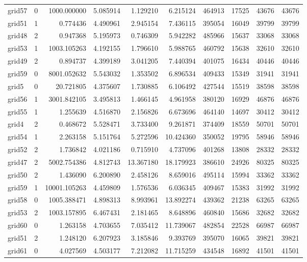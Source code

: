 \begin{longtable}{|l|r|r|r|r|r|r|r|r|r|}
grid57 & 0 & 1000.000000 & 5.085914 & 1.129210 & 6.215124 & 464913 & 17525 & 43676 & 43676 \\
grid51 & 1 & 0.774436 & 4.490961 & 2.945154 & 7.436115 & 395054 & 16049 & 39799 & 39799 \\
grid48 & 2 & 0.947368 & 5.195973 & 0.746309 & 5.942282 & 485966 & 15637 & 33068 & 33068 \\
grid53 & 1 & 1003.105263 & 4.192155 & 1.796610 & 5.988765 & 460792 & 15638 & 32610 & 32610 \\
grid49 & 2 & 0.894737 & 4.399189 & 3.041205 & 7.440394 & 401075 & 16434 & 40446 & 40446 \\
grid59 & 0 & 8001.052632 & 5.543032 & 1.353502 & 6.896534 & 409433 & 15349 & 31941 & 31941 \\
grid5 & 0 & 20.721805 & 4.375607 & 1.730885 & 6.106492 & 427544 & 15519 & 38598 & 38598 \\
grid56 & 1 & 3001.842105 & 3.495813 & 1.466145 & 4.961958 & 380120 & 16929 & 46876 & 46876 \\
grid55 & 1 & 1.255639 & 4.516870 & 2.156826 & 6.673696 & 464140 & 14697 & 30412 & 30412 \\
grid4 & 2 & 0.468672 & 5.528471 & 3.733400 & 9.261871 & 374409 & 18559 & 50701 & 50701 \\
grid54 & 1 & 2.263158 & 5.151764 & 5.272596 & 10.424360 & 350052 & 19795 & 58946 & 58946 \\
grid52 & 2 & 1.736842 & 4.021186 & 0.715910 & 4.737096 & 401268 & 13808 & 28332 & 28332 \\
grid47 & 2 & 5002.754386 & 4.812743 & 13.367180 & 18.179923 & 386610 & 24926 & 80325 & 80325 \\
grid50 & 2 & 1.436090 & 6.200890 & 2.458126 & 8.659016 & 495114 & 15994 & 33362 & 33362 \\
grid59 & 1 & 10001.105263 & 4.459809 & 1.576536 & 6.036345 & 409467 & 15383 & 31992 & 31992 \\
grid58 & 0 & 1005.388471 & 4.898313 & 8.993961 & 13.892274 & 439362 & 21238 & 63265 & 63265 \\
grid53 & 2 & 1003.157895 & 6.467431 & 2.181465 & 8.648896 & 460840 & 15686 & 32682 & 32682 \\
grid60 & 0 & 1.263158 & 4.703655 & 7.035412 & 11.739067 & 482854 & 22528 & 66987 & 66987 \\
grid51 & 2 & 1.248120 & 6.207923 & 3.185846 & 9.393769 & 395070 & 16065 & 39821 & 39821 \\
grid61 & 0 & 4.027569 & 4.503177 & 7.212082 & 11.715259 & 434548 & 16892 & 41501 & 41501 \\

\end{longtable}
